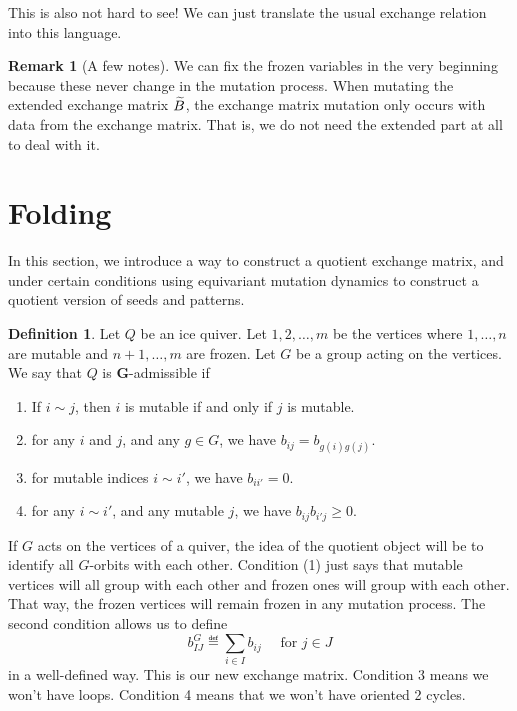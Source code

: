 \documentclass[]{pcmi}
\theoremstyle{plain}
\theoremstyle{definition}
\newtheorem{Definition}[equation]{Definition}
\newtheorem{Remark}[equation]{Remark}
\begin{document}
This is also not hard to see! We can just translate the usual exchange relation into this language. 

\begin{Remark}[A few notes] 
    We can fix the frozen variables in the very beginning because these never change in the mutation process. When mutating the extended exchange matrix $\widetilde{B}$, the exchange matrix mutation only occurs with data from the exchange matrix. That is, we do not need the extended part at all to deal with it. 
\end{Remark}

\section{Folding}

In this section, we introduce a way to construct a quotient exchange matrix, and under certain conditions using equivariant mutation dynamics to construct a quotient version of seeds and patterns. 

\begin{Definition}
    Let $Q$ be an ice quiver. Let $1, 2, \ldots, m$ be the vertices where $1, \ldots, n$ are mutable and $n+1, \ldots, m$ are frozen. Let $G$ be a group acting on the vertices. We say that $Q$ is \textbf{G}-admissible if 
    \begin{enumerate}
        \item  If $i \sim j$, then $i$ is mutable if and only if $j$ is mutable. 
        \item for any $i$ and $j$, and any $g \in G$, we have $b_{ij} = b_{g(i)g(j)}$. 
        \item for mutable indices $i \sim i'$, we have $b_{ii'} = 0$.
        \item for any $i \sim i'$, and any mutable $j$, we have $b_{ij} b_{i'j} \geq 0$. 
    \end{enumerate}
\end{Definition}

If $G$ acts on the vertices of a quiver, the idea of the quotient object will be to identify all $G$-orbits with each other. Condition (1) just says that mutable vertices will all group with each other and frozen ones will group with each other. That way, the frozen vertices will remain frozen in any mutation process. The second condition allows us to define 
\begin{equation}\label{eqn:new-exchange-matrix}
    b_{IJ}^G \eqdef \sum_{i \in I} b_{ij} \quad \text{ for } j \in J
\end{equation}
in a well-defined way. This is our new exchange matrix. Condition 3 means we won't have loops. Condition 4 means that we won't have oriented 2 cycles.  
\end{document}
